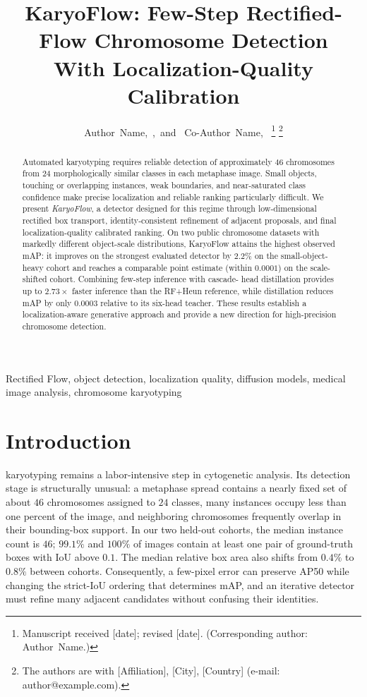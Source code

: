 \documentclass[journal,10pt]{IEEEtran}
\title{KaryoFlow: Few-Step Rectified-Flow Chromosome Detection\\
       With Localization-Quality Calibration}
\author{Author~Name,~\IEEEmembership{Member,~IEEE},~and~
        Co-Author~Name,~\IEEEmembership{Senior~Member,~IEEE}%
\thanks{Manuscript received [date]; revised [date]. (Corresponding author: Author~Name.)}%
\thanks{The authors are with [Affiliation], [City], [Country] (e-mail: author@example.com).}%
}
\theoremstyle{definition}
\begin{document}
\maketitle

\begin{abstract}
Automated karyotyping requires reliable detection of approximately $46$
chromosomes from $24$ morphologically similar classes in each metaphase image.
Small objects, touching or overlapping instances, weak boundaries, and
near-saturated class confidence make precise localization and reliable ranking
particularly difficult. We present
\emph{KaryoFlow}, a detector designed for this regime through
low-dimensional rectified box transport, identity-consistent refinement of
adjacent proposals, and final localization-quality calibrated ranking. On two
public chromosome datasets with markedly different object-scale distributions,
KaryoFlow attains the highest observed mAP: it improves on the strongest
evaluated detector by $2.2\%$ on the small-object-heavy cohort and reaches a
comparable point estimate (within $0.0001$) on the scale-shifted cohort. Combining few-step inference with cascade-
head distillation provides up to $2.73\times$ faster inference than the
RF+Heun reference, while distillation reduces mAP by only $0.0003$ relative to
its six-head teacher. These results establish a localization-aware generative
approach and provide a new direction for high-precision chromosome detection.
\end{abstract}

\begin{IEEEkeywords}
Rectified Flow, object detection, localization quality, diffusion models, medical image analysis, chromosome karyotyping
\end{IEEEkeywords}

\section{Introduction}\label{sec:intro}

 karyotyping remains a labor-intensive step in
cytogenetic analysis.
Its detection stage is structurally unusual: a metaphase spread contains a
nearly fixed set of about $46$ chromosomes assigned to $24$ classes, many
instances occupy less than one percent of the image, and neighboring
chromosomes frequently overlap in their bounding-box support. In our two
held-out cohorts, the median instance count is $46$; $99.1\%$ and $100\%$ of
images contain at least one pair of ground-truth boxes with IoU above $0.1$.
The median relative box area also shifts from $0.4\%$ to $0.8\%$ between
cohorts. Consequently, a few-pixel error can preserve AP50 while changing the
strict-IoU ordering that determines mAP, and an iterative detector must refine
many adjacent candidates without confusing their identities.
\end{document}
